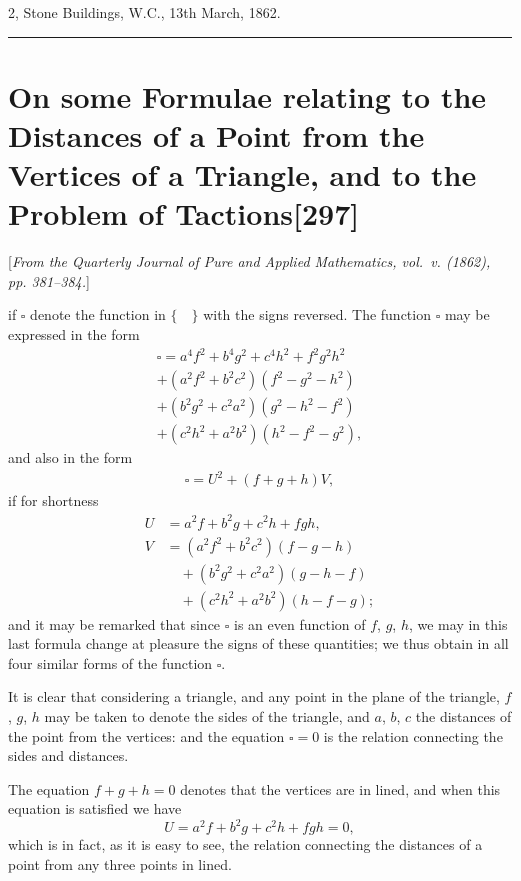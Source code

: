 \documentclass[11pt,a4paper]{article}
\newcommand{\paper}[2]{\section[#1]{#1\hfill\textnormal{[#2]}}}
\begin{document}
\begin{flushright}
2, Stone Buildings, W.C., 13th March, 1862.
\end{flushright}

\vspace{1.5em}
\hrule
\vspace{1.5em}

\paper{On some Formulae relating to the Distances of a Point from the Vertices of a Triangle, and to the Problem of Tactions}{297}

{\small
[\textit{From the Quarterly Journal of Pure and Applied Mathematics, vol.~v. (1862), pp. 381--384.}]
\par}
\vspace{0.5em}

\setcounter{page}{511}

if $\square$ denote the function in $\{\quad\}$ with the signs reversed. The function $\square$ may be expressed in the form
\begin{multline*}
\square = a^4f^2 + b^4g^2 + c^4h^2 + f^2g^2h^2\\
+ (a^2f^2 + b^2c^2)(f^2 - g^2 - h^2)\\
+ (b^2g^2 + c^2a^2)(g^2 - h^2 - f^2)\\
+ (c^2h^2 + a^2b^2)(h^2 - f^2 - g^2),
\end{multline*}
and also in the form
\begin{multline*}
\square = U^2 + (f+g+h)V,
\end{multline*}
if for shortness
\begin{align*}
U &= a^2f + b^2g + c^2h + fgh,\\
V &= (a^2f^2 + b^2c^2)(f-g-h)\\
&\quad + (b^2g^2 + c^2a^2)(g-h-f)\\
&\quad + (c^2h^2 + a^2b^2)(h-f-g);
\end{align*}
and it may be remarked that since $\square$ is an even function of $f$, $g$, $h$, we may in this last formula change at pleasure the signs of these quantities; we thus obtain in all four similar forms of the function $\square$.

It is clear that considering a triangle, and any point in the plane of the triangle, $f$, $g$, $h$ may be taken to denote the sides of the triangle, and $a$, $b$, $c$ the distances of the point from the vertices: and the equation $\square = 0$ is the relation connecting the sides and distances.

The equation $f+g+h=0$ denotes that the vertices are in lined, and when this equation is satisfied we have
\[
U = a^2f + b^2g + c^2h + fgh = 0,
\]
which is in fact, as it is easy to see, the relation connecting the distances of a point from any three points in lined.
\end{document}
